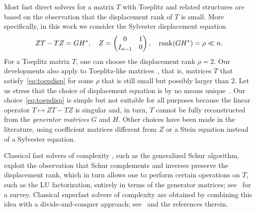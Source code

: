 \documentclass[final,reqno,onefignum,onetabnum]{siamart190516}
\newcommand{ \rank}{{\rm rank}}
\begin{document}
Most fast direct solvers for a matrix $T$ with Toeplitz and related structures are based on the observation that the displacement rank of $T$ is small. More specifically, in this work we consider the Sylvester displacement equation
\begin{equation} 
\label{eq:toepdisp}
Z T -TZ = GH^*, \quad Z = \begin{pmatrix} 0 & 1 \\ I_{n-1} & 0 \end{pmatrix}, \quad\rank({G}{H}^*) = \rho \ll n. 
\end{equation}
For a Toeplitz matrix $T$, one can choose the displacement rank $\rho=2$. 
Our developments also apply to Toeplitz-like matrices~\cite{kailath1995displacement,pan2012structured}, that is, matrices $T$ that satisfy~\eqref{eq:toepdisp} for some $\rho$ that is still small but possibly larger than $2$. Let us stress that the choice of displacement equation is by no means unique~\cite{kailath1995displacement}.
Our choice~\eqref{eq:toepdisp} is simple but not suitable for all purposes because the linear operator $T\mapsto Z T -TZ$ is singular and, in turn, $T$ cannot be fully reconstructed from the  \textit{generator matrices} $G$ and $H$. Other choices have been made in the literature, using coefficient matrices different from $Z$ or a Stein equation instead of a Sylvester equation.

Classical fast solvers of complexity , such as the generalized Schur algorithm, exploit the observation that Schur complements and inverses preserve the displacement rank, which in turn allows one to perform certain operations on $T$, such as the LU factorization, entirely in terms of the generator matrices; see~\cite{kailath1995displacement} for a survey. Classical superfast solvers of complexity  are obtained by combining this idea with a divide-and-conquer approach; see~\cite{Huckle1998} and the references therein.
\end{document}

